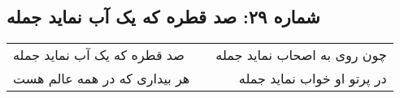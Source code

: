\begin{center}
\section*{شماره ۲۹: صد قطره که یک آب نماید جمله}
\label{sec:029}
\begin{longtable}{l p{0.5cm} r}
صد قطره که یک آب نماید جمله
&&
چون روی به اصحاب نماید جمله
\\
هر بیداری که در همه عالم هست
&&
در پرتو او خواب نماید جمله
\\
\end{longtable}
\end{center}
